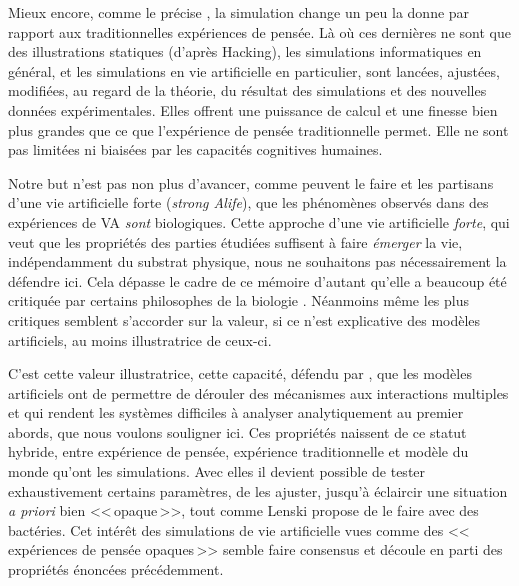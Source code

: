 Mieux encore, comme le précise \cite{winsberg03simulatedexperimentsmethodologyforavirtualworld}, la simulation change un peu la donne par rapport aux traditionnelles expériences de pensée. Là où ces dernières ne sont que des illustrations statiques (d'après Hacking), les simulations informatiques en général, et les simulations en vie artificielle en particulier, sont lancées, ajustées, modifiées, au regard de la théorie, du résultat des simulations et des nouvelles données expérimentales. Elles offrent une puissance de calcul et une finesse bien plus grandes que ce que l'expérience de pensée traditionnelle permet. Elle ne sont pas limitées ni biaisées par les capacités cognitives humaines.

Notre but n'est pas non plus d'avancer, comme peuvent le faire \citet{bedau98philosophicalcontentmethodartificiallife} et les partisans d'une vie artificielle forte (\emph{strong Alife}), que les phénomènes observés dans des expériences de VA \emph{sont} biologiques. Cette approche d'une vie artificielle \emph{forte}, qui veut que les propriétés des parties étudiées suffisent à faire \emph{émerger} la vie, indépendamment du substrat physique, nous ne souhaitons pas nécessairement la défendre ici. Cela dépasse le cadre de ce mémoire d'autant qu'elle a beaucoup été critiquée par certains philosophes de la biologie \citep[Ch. 15]{sterelny99sexdeathintroductiontophilosophybiology}. Néanmoins même les plus critiques semblent s'accorder sur la valeur, si ce n'est explicative des modèles artificiels, au moins illustratrice de ceux-ci. 

C'est cette valeur illustratrice, cette capacité, défendu par \citet{paolo00simulationmodelsasopaquethoughtexperiments}, que les modèles artificiels ont de permettre de dérouler des mécanismes aux interactions multiples et qui rendent les systèmes difficiles à analyser analytiquement au premier abords, que nous voulons souligner ici. Ces propriétés naissent de ce statut hybride, entre expérience de pensée, expérience traditionnelle et modèle du monde qu'ont les simulations. Avec elles il devient possible de tester exhaustivement certains paramètres, de les ajuster, jusqu'à éclaircir une situation \emph{a priori} bien <<\,opaque\,>>, tout comme Lenski propose de le faire avec des bactéries. Cet intérêt des simulations de vie artificielle vues comme des <<\,expériences de pensée opaques\,>> semble faire consensus et découle en parti des propriétés énoncées précédemment. 

